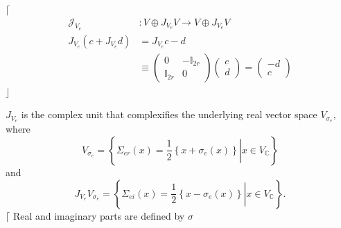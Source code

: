 \documentclass[aps,preprint]{revtex4}
\begin{document}
$\lceil$%
\begin{align}
\mathcal{J}_{V_{e}} & :V\oplus J_{V_{e}}V\rightarrow V\oplus J_{V_{e}}V \\
J_{V_{e}}\left( c+J_{V_{e}}d\right) & =J_{V_{e}}c-d \\
& \equiv\left( 
\begin{array}{cc}
0 & -\mathbb{I}_{2r} \\ 
\mathbb{I}_{2r} & 0%
\end{array}
\right) \left( 
\begin{array}{c}
c \\ 
d%
\end{array}
\right) =\left( 
\begin{array}{c}
-d \\ 
c%
\end{array}
\right)
\end{align}
$\rfloor$

$J_{V_{e}}$ is the complex unit that complexifies the underlying real vector
space $V_{\sigma_{e}},$ where 
\begin{equation}
V_{\sigma_{e}}=\left\{ \left. \Sigma_{er}\left( x\right) =\frac{1}{2}\left\{
x+\sigma_{e}\left( x\right) \right\} \right\vert x\in V_{\mathbb{C}}\right\}
\end{equation}
and 
\begin{equation}
J_{V_{e}}V_{\sigma_{e}}=\left\{ \left. \Sigma_{ei}\left( x\right) =\frac{1}{2%
}\left\{ x-\sigma_{e}\left( x\right) \right\} \right\vert x\in V_{\mathbb{C}%
}\right\} .
\end{equation}
$\lceil$ Real and imaginary parts are defined by $\sigma$
\end{document}
